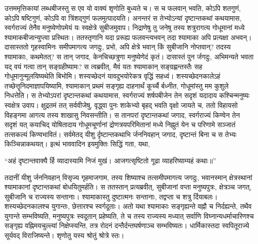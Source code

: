 \vakya उत्तममृत्तिकायां लब्धबीजस्तु स एव यो वाक्यं शृणोति बुध्यते च। स च फलवान् भवति, कोऽपि शतगुणं, कोऽपि षष्टिगुणं, कोऽपि वा त्रिंशद्गुणं फलमुत्पादयति।
\vakya अनन्तरं स तेभ्योऽन्यां दृष्टान्तकथां कथयामास, स्वर्गराज्यं तेनैव मनुष्येणोपमेयं यः स्वक्षेत्रे सुबीजमुवाप।
\vakya निद्राणेषु तु जनेषु तस्य शत्रुरागत्य गोधूमानां मध्ये श्यामाकबीजान्युप्त्वा प्रस्थितः।
\vakya ततस्तृणानि यदा प्ररूह्य फलवन्त्यभवन् तदा श्यामाका अपि प्रत्यक्षा अभवन्।
\vakya दासास्ततो गृहस्वामिनः समीपमागत्य जगदुः, प्रभो, अपि क्षेत्रे भवान् किं सुबीजानि नोप्तवान्? तदस्य श्यामाकाः, कथमेतत्?
\vakya स तान् जगाद, केनचिच्छत्रुणा मनुष्येणेदं कृतं। दासास्तं पुन र्जगदुः, अभिमन्यते भवता यद् वयं गत्वा तान् सङ्ग्रहीष्यामः?
\vakya स त्वब्रवीत्, मैवं यतः श्यामाकान् सङ्ग्रह्णन्तस्तैः सह गोधूमानुन्मूलयिष्यथेति बिभोमि।
\vakya शस्यच्छेदनं यावदुभयोरेकत्र वृद्धिं सहध्वं। शस्यच्छेदनकालेऽहं तच्छेत्तॄनिदमाज्ञापयिष्यामि, श्यामाकान् प्रथमं सङ्गृह्य दाहनार्थं कूर्च्चै र्बध्नीत, गोधूमांस्तु मम कुशुले निधत्तेति।
\vakya स तेभ्योऽपरां दृष्टान्तकथां कथयामास, स्वर्गराज्यं शर्षपबीजेन तेन सदृशं यदादाय कश्चिन्मनुष्यः स्वक्षेत्र उवाप।
\vakya क्षुद्रतमं तत् सर्ववीजेषु, वृद्ध्वा पुनः शाकेभ्यो बृहद् भवति वृक्षो जायते च, ततो विहायसो विहङ्गमा आगत्य तस्य शाखासु निवसन्तीति।
\vakya स तानपरां दृष्टान्तकथां जगाद, स्वर्गराज्यं किण्वेन तेन सदृशं यत् कयाचिद् योषितादाय गोधूमचूर्णानां द्रोणत्रयपरिमितानां मध्ये निह्नुतं येन च परिणामे सञ्जातं तत्सकल्यं किण्वभावितं।
\vakya सर्वमेतद् यीशु र्दृष्टान्तकथाभि र्जननिवहान् जगाद, दृष्टान्तं बिना च स तेभ्यः किञ्चिन्नाकथयत्।
\vakya इत्थं भाववादिन इयमुक्तिः सिद्धिं गता, यथा,
\begin{poem}
\startwithline “अहं दृष्टान्तवाक्यै र्हि व्यादास्यामि निजं मुखं।
\pline आजगत्सृष्टितो गूढा व्याहरिष्याम्यहं कथाः॥”
\end{poem}
\vakya तदानीं यीशु र्जननिवहान् विसृज्य गृहमाजगाम, तस्य शिष्याश्च तत्समीपमागत्य जगदुः, भवानस्मान् क्षेत्रस्थानां श्यामाकानां दृष्टान्तकथां बोधयितुमर्हति।
\vakya स ततस्तान् प्रत्यब्रवीत्, सुबीजानां वप्ता मनुष्यपुत्रः, क्षेत्रञ्च जगत्, सुबीजानि च राज्यस्य सन्तानाः।
\vakya श्यामाकास्तु दुष्टात्मनः सन्तानाः, तद्वप्ता च शत्रु र्दियाबलः।
\vakya शस्यच्छेदनकालश्च युगान्तः, छेत्तारश्च स्वर्गदूताः।
\vakya अतो यथा श्यामाकाः सङ्गृह्यन्ते वह्नौ च निर्दह्यन्ते, तथैव युगान्ते सम्भविष्यति,
\vakya मनुष्यपुत्रः स्वदूतान् प्रहेष्यति, ते च तस्य राज्यस्य मध्यात् सर्वाणि विघ्नान्यधर्माचारिणश्च सङ्गृह्य वह्निमयचुल्ल्यां निक्षेप्स्यन्ति,
\vakya तत्र रोदनं दन्तैर्दन्तघर्षणाञ्च सम्भविष्यतः।
\vakya धार्मिकास्तदा स्वपितूराज्ये सूर्यवद् विराजिष्यन्ते। शृणोतु यस्य श्रोतुं श्रोत्रे स्तः।
